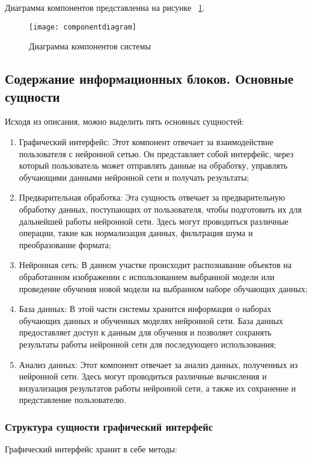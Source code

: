 Диаграмма компонентов представленна на рисунке ~\ref{componentdiagram:image}.

\begin{figure}[ht]
\texttt{[image: componentdiagram]}
\caption{Диаграмма компонентов системы}
\label{componentdiagram:image}
\end{figure}

\subsection{Содержание информационных блоков. Основные сущности}

Исходя из описания, можно выделить пять основных сущностей:

\begin{enumerate}
\item Графический интерфейс: Этот компонент отвечает за взаимодействие пользователя с нейронной сетью. Он представляет собой интерфейс, через который пользователь может отправлять данные на обработку, управлять обучающими данными нейронной сети и получать результаты;
\item Предварительная обработка: Эта сущность отвечает за предварительную обработку данных, поступающих от пользователя, чтобы подготовить их для дальнейшей работы нейронной сети. Здесь могут проводиться различные операции, такие как нормализация данных, фильтрация шума и преобразование формата;
\item Нейронная сеть: В данном участке происходит распознавание объектов на обработанном изображении с использованием выбранной модели или проведение обучения новой модели на выбранном наборе обучающих данных;
\item База данных: В этой части системы хранится информация о наборах обучающих данных и обученных моделях нейронной сети. База данных предоставляет доступ к данным для обучения и позволяет сохранять результаты работы нейронной сети для последующего использования;
\item Анализ данных: Этот компонент отвечает за анализ данных, полученных из нейронной сети. Здесь могут проводиться различные вычисления и визуализация результатов работы нейронной сети, а также их сохранение и представление пользователю.
\end{enumerate}

\subsubsection{Структура сущности графический интерфейс}
Графический интерфейс хранит в себе методы:

